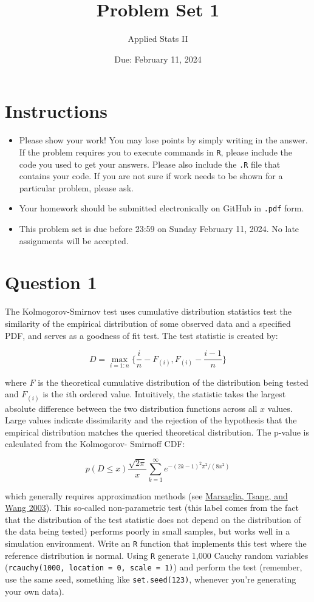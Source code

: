\documentclass[12pt,letterpaper]{article}
\title{Problem Set 1}
\date{Due: February 11, 2024}
\author{Applied Stats II}
\begin{document}
	\maketitle
	\section*{Instructions}
	\begin{itemize}
	\item Please show your work! You may lose points by simply writing in the answer. If the problem requires you to execute commands in \texttt{R}, please include the code you used to get your answers. Please also include the \texttt{.R} file that contains your code. If you are not sure if work needs to be shown for a particular problem, please ask.
\item Your homework should be submitted electronically on GitHub in \texttt{.pdf} form.
\item This problem set is due before 23:59 on Sunday February 11, 2024. No late assignments will be accepted.
	\end{itemize}

	\vspace{.25cm}
\section*{Question 1} 
\vspace{.25cm}
\noindent The Kolmogorov-Smirnov test uses cumulative distribution statistics test the similarity of the empirical distribution of some observed data and a specified PDF, and serves as a goodness of fit test. The test statistic is created by:

$$D = \max_{i=1:n} \Big\{ \frac{i}{n}  - F_{(i)}, F_{(i)} - \frac{i-1}{n} \Big\}$$

\noindent where $F$ is the theoretical cumulative distribution of the distribution being tested and $F_{(i)}$ is the $i$th ordered value. Intuitively, the statistic takes the largest absolute difference between the two distribution functions across all $x$ values. Large values indicate dissimilarity and the rejection of the hypothesis that the empirical distribution matches the queried theoretical distribution. The p-value is calculated from the Kolmogorov-
Smirnoff CDF:

$$p(D \leq x) \frac{\sqrt {2\pi}}{x} \sum _{k=1}^{\infty }e^{-(2k-1)^{2}\pi ^{2}/(8x^{2})}$$


\noindent which generally requires approximation methods (see \href{https://core.ac.uk/download/pdf/25787785.pdf}{Marsaglia, Tsang, and Wang 2003}). This so-called non-parametric test (this label comes from the fact that the distribution of the test statistic does not depend on the distribution of the data being tested) performs poorly in small samples, but works well in a simulation environment. Write an \texttt{R} function that implements this test where the reference distribution is normal. Using \texttt{R} generate 1,000 Cauchy random variables (\texttt{rcauchy(1000, location = 0, scale = 1)}) and perform the test (remember, use the same seed, something like \texttt{set.seed(123)}, whenever you're generating your own data).\\
	
\end{document}
